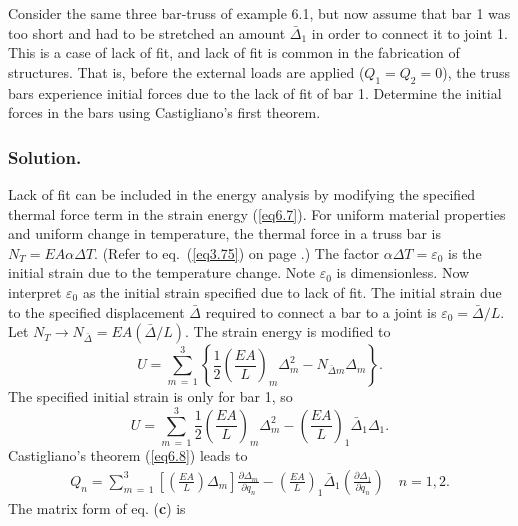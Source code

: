 \documentclass{AeroStructure-ERJohnson}
\begin{document}
\clearpage

\begin{example*}\label{ex6.2}Consider the same three bar-truss of example 6.1, but now assume that bar 1 was too short and had to be stretched an amount $\bar{\Delta}_{1}$ in order to connect it to joint 1. This is a case of lack of fit, and lack of fit is common in the fabrication of structures. That is, before the external loads are applied ($Q_{1}=Q_{2}=0$), the truss bars experience initial forces due to the lack of fit of bar 1. Determine the initial forces in the bars using Castigliano's first theorem.

\subsubsection{Solution.} Lack of fit can be included in the energy analysis by modifying the specified thermal force term in the strain energy (\ref{eq6.7}). For uniform material properties and uniform change in temperature, the thermal force in a truss bar is $N_{T}=E A \alpha \Delta T$. (Refer to eq.~(\ref{eq3.75}) on page \pageref{eq3.75}.) The factor $\alpha \Delta T=\varepsilon_{0}$ is the initial strain due to the temperature change. Note $\varepsilon_{0}$ is dimensionless. Now interpret $\varepsilon_{0}$ as the initial strain specified due to lack of fit. The initial strain due to the specified displacement $\bar{\Delta}$ required to connect a bar to a joint is $\varepsilon_{0}=\bar{\Delta}/ L$. Let
$N_{T} \rightarrow N_{\bar{\Delta}}=E A(\bar{\Delta}/ L)$. The strain energy is modified to
\begin{equation*}
U=\sum_{m\,=\,1}^3\left\{\frac{1}{2}\left(\frac{E A}{L}\right)_{m} \Delta_{m}^{2}-N_{\bar{\Delta} m}\Delta_{m}\right\}.\tag{a}
\end{equation*}
The specified initial strain is only for bar 1, so
\begin{equation*}
U=\sum_{m\,=\,1}^3 \frac{1}{2}\left(\frac{E A}{L}\right)_{m} \Delta_{m}^{2}-\left(\frac{E A}{L}\right)_{1} \bar{\Delta}_{1} \Delta_{1}.\tag{b}
\end{equation*}
Castigliano's theorem (\ref{eq6.8}) leads to
\begin{gather}
Q_{n}=\sum_{m\,=\,1}^3\left[\left(\frac{E A}{L}\right) \Delta_{m}\right] \frac{\partial \Delta_{m}}{\partial q_{n}}-\left(\frac{E A}{L}\right)_{1} \bar{\Delta}_{1}\left(\frac{\partial \Delta_{1}}{\partial q_{n}}\right) \quad n=1,2.\tag{c}
\end{gather}
The matrix form of eq. (\textbf{c}) is

\end{example*}
\end{document}
